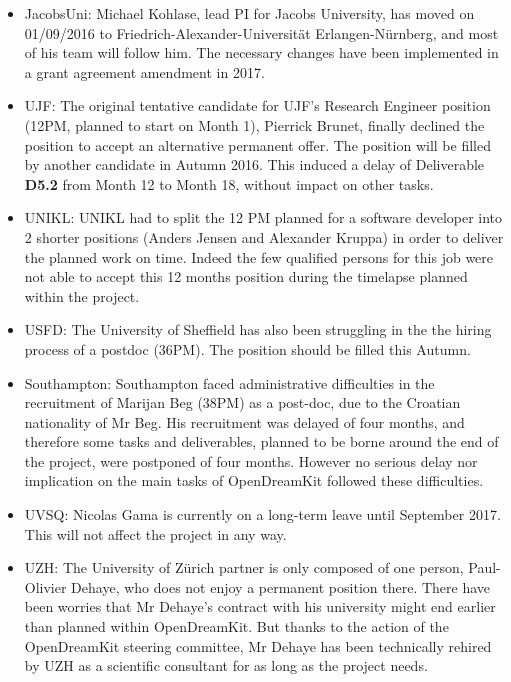 \documentclass{deliverablereport}
\begin{document}
\begin{itemize}
\item{JacobsUni:} Michael Kohlase, lead PI for Jacobs University, has
  moved on 01/09/2016 to Friedrich-Alexander-Universität
  Erlangen-Nürnberg, and most of his team will follow him. The necessary changes have been
  implemented in a grant agreement amendment in 2017.\\

\item{UJF:} The original tentative candidate for UJF's Research
  Engineer position (12PM, planned to start on Month 1), Pierrick
  Brunet, finally declined the position to accept an alternative
  permanent offer. The position will be filled by another candidate in
  Autumn 2016. This induced a delay of Deliverable \textbf{D5.2} from Month 12
  to Month 18, without impact on other tasks.\\

\item{UNIKL:} UNIKL had to split the 12 PM planned for a software developer into 2 shorter positions (Anders Jensen and Alexander Kruppa) in order to deliver the planned work on time. Indeed the few qualified persons for this job were not able to accept this 12 months position during the timelapse planned within the project.\\

\item{USFD:} The University of Sheffield has also been struggling in the the hiring process of a postdoc (36PM). The position should be filled this Autumn.\\

\item{Southampton:} Southampton faced administrative difficulties in the recruitment of Marijan Beg (38PM) as a post-doc, due to the Croatian nationality of Mr Beg. His recruitment was delayed of four months, and therefore some tasks and deliverables, planned to be borne around the end of the project, were postponed of four months. However no serious delay nor implication on the main tasks of OpenDreamKit followed these difficulties.\\

\item{UVSQ:} Nicolas Gama is currently on a long-term leave until September 2017. This will not affect the project in any way.\\

\item{UZH:} The University of Zürich partner is only composed of one person, Paul-Olivier Dehaye, who does not enjoy a permanent position there. There have been worries that Mr Dehaye's contract with his university might end earlier than planned within OpenDreamKit. But thanks to the action of the OpenDreamKit steering committee, Mr Dehaye has been technically rehired by UZH as a scientific consultant for as long as the project needs.\\


\end{itemize}
\end{document}
